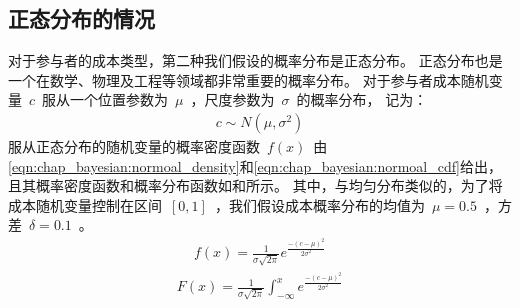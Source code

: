\subsection{正态分布的情况}
对于参与者的成本类型，第二种我们假设的概率分布是正态分布。
正态分布也是一个在数学、物理及工程等领域都非常重要的概率分布。
对于参与者成本随机变量~$c$~服从一个位置参数为~$\mu$~，尺度参数为~$\sigma$~的概率分布，
记为：
\begin{align*}
    c \sim N(\mu, \sigma^2)
\end{align*}
服从正态分布的随机变量的概率密度函数~$f(x)$~由\eqref{eqn:chap_bayesian:normoal_density}和\eqref{eqn:chap_bayesian:normoal_cdf}给出，
且其概率密度函数和概率分布函数如和所示。
其中，与均匀分布类似的，为了将成本随机变量控制在区间~$[0,1]$~，我们假设成本概率分布的均值为~$\mu = 0.5$~，方差~$\delta = 0.1$~。
\begin{align}
    f(x) = \frac{1}{\sigma \sqrt{2\pi} } e^{ \frac{-(c-\mu)^2}{2\sigma^2}}
    \label{eqn:chap_bayesian:normoal_density}
\end{align}
\begin{align}
    F(x) = \frac{1}{\sigma \sqrt{2\pi} } \int^x_{-\infty}e^{ \frac{-(c-\mu)^2}{2\sigma^2}}
    \label{eqn:chap_bayesian:normoal_cdf}
\end{align}
